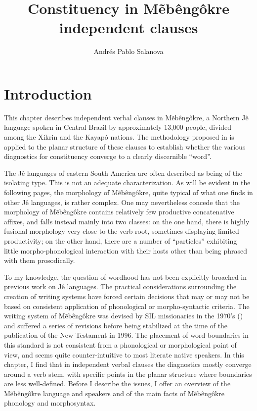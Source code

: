 \documentclass[output=paper]{langscibook}
\title{Constituency in Mẽbêngôkre independent clauses}
\author{Andrés Pablo Salanova\affiliation{Université d'Ottawa}}
\begin{document}
\maketitle

\section{Introduction}

This chapter describes independent verbal clauses in Mẽbêngôkre, a Northern Jê language spoken in Central Brazil by approximately 13,000 people, divided among the Xikrin and the Kayapó nations. The methodology proposed in \citet{tallmancoincidence:2020} is applied to the planar structure of these clauses to establish whether the various diagnostics for constituency converge to a clearly discernible ``word''.

The Jê languages of eastern South America are often described as being of the isolating type. This is not an adequate characterization. As will be evident in the following pages, the morphology of Mẽbêngôkre, quite typical of what one finds in other Jê languages, is rather complex. One may nevertheless concede that the morphology of Mẽbêngôkre contains relatively few productive concatenative affixes, and falls instead mainly into two classes: on the one hand, there is highly fusional morphology very close to the verb root, sometimes displaying limited productivity; on the other hand, there are a number of ``particles'' exhibiting little morpho-phonological interaction with their hosts other than being phrased with them prosodically.

To my knowledge, the question of wordhood has not been explicitly broached in previous work on Jê languages. The practical considerations surrounding the creation of writing systems have forced certain decisions that may or may not be based on consistent application of phonological or morpho-syntactic criteria. The writing system of Mẽbêngôkre was devised by SIL missionaries in the 1970’s (\citealt{stout-thomson:fonemica}) and suffered a series of revisions before being stabilized at the time of the publication of the New Testament in 1996. The placement of word boundaries in this standard is not consistent from a phonological or morphological point of view, and seems quite counter-intuitive to most literate native speakers. In this chapter, I find that in independent verbal clauses the diagnostics mostly converge around a verb stem, with specific points in the planar structure where boundaries are less well-defined. Before I describe the issues, I offer an overview of the Mẽbêngôkre language and speakers and of the main facts of Mẽbêngôkre phonology and morphosyntax.
\end{document}
